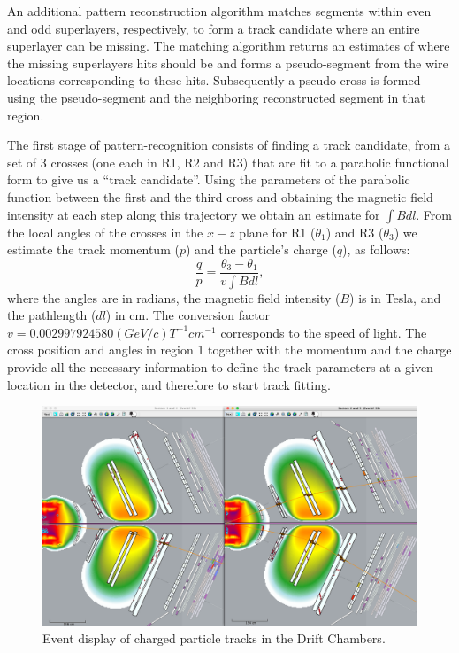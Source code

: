 \documentclass[3p,times,twocolumn]{elsarticle}
\begin{document}
An additional  pattern reconstruction algorithm  matches segments within even and odd superlayers, respectively, to form
a track candidate where an entire superlayer can be missing.  The matching algorithm returns an estimates of where the missing
superlayers hits should be and forms a pseudo-segment from the wire locations corresponding to these hits.  Subsequently
a pseudo-cross is formed using the pseudo-segment and the neighboring reconstructed segment in that region.

The first stage of
pattern-recognition consists of finding a track candidate, from a set of 3 crosses (one each in R1, R2 and R3) that
are fit to a parabolic functional form to give us a ``track candidate''.
Using the parameters of the parabolic function between the first and the third cross and obtaining the magnetic field
intensity at each step along this trajectory we obtain an estimate for $\int B dl$.
From the local angles of the crosses in the $x-z$ plane for R1 ($\theta_1$) and R3 ($\theta_3$) we estimate the track momentum ($p$)
and the particle's charge ($q$),
as follows:
\begin{equation}\frac{q}{p} = \frac{\theta_3 - \theta_1}{v\int{B dl}},\end{equation} where the angles are in radians, the magnetic field
intensity ($B$) is in Tesla, and the pathlength ($dl$) in cm.
The conversion factor  $v = 0.002997924580 (GeV/c) T^{-1} cm^{-1}$  corresponds to the speed of light.
The cross position and angles in region 1 together with the
momentum and the charge provide all the necessary information to define the track parameters at a given location in the detector,
and therefore to start track fitting.

\begin{figure}
\includegraphics[width=1.0\textwidth]{pics/dcTrack3.png}
\caption{Event display of charged particle tracks in the Drift Chambers.
}
\label{fig:dcTracks}
\end{figure}
\end{document}
